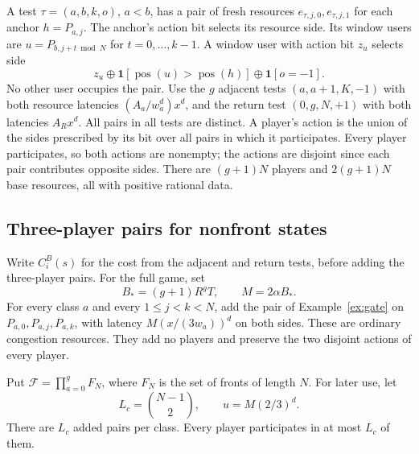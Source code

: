 \documentclass[11pt]{article}
\theoremstyle{definition}
\newcommand{\F}{\mathcal F}
\newcommand{\ind}{\mathbf 1}
\newcommand{\xor}{\mathbin{\oplus}}
\DeclareMathOperator{\pos}{pos}
\begin{document}
A test $\tau=(a,b,k,o)$, $a<b$, has a pair of fresh resources $e_{\tau,j,0},e_{\tau,j,1}$ for each anchor $h=P_{a,j}$. The anchor's action bit selects its resource side. Its window users are $u=P_{b,j+t\bmod N}$ for $t=0,\ldots,k-1$. A window user with action bit $z_u$ selects side
\begin{equation}\label{eq:appincidence}
 z_u\xor\ind[\pos(u)>\pos(h)]\xor\ind[o=-1].
\end{equation}
No other user occupies the pair. Use the $g$ adjacent tests $(a,a+1,K,-1)$ with both resource latencies $(A_a/w_a^d)x^d$, and the return test $(0,g,N,+1)$ with both latencies $A_Rx^d$. All pairs in all tests are distinct. A player's action is the union of the sides prescribed by its bit over all pairs in which it participates. Every player participates, so both actions are nonempty; the actions are disjoint since each pair contributes opposite sides. There are $(g+1)N$ players and $2(g+1)N$ base resources, all with positive rational data.


\subsection{Three-player pairs for nonfront states}
Write $C_i^B(s)$ for the cost from the adjacent and return tests, before adding the three-player pairs. For the full game, set
\begin{equation}\label{eq:maincompletion}
 B_*=(g+1)R^gT,\qquad M=2\alpha B_*.
\end{equation}
For every class $a$ and every $1\le j<k<N$, add the pair of Example~\ref{ex:gate} on $P_{a,0},P_{a,j},P_{a,k}$, with latency $M(x/(3w_a))^d$ on both sides. These are ordinary congestion resources. They add no players and preserve the two disjoint actions of every player.


Put $\F=\prod_{a=0}^gF_N$, where $F_N$ is the set of fronts of length $N$. For later use, let
\[
 L_c=\binom{N-1}{2},\qquad u=M(2/3)^d.
\]
There are $L_c$ added pairs per class. Every player participates in at most $L_c$ of them.
\end{document}
